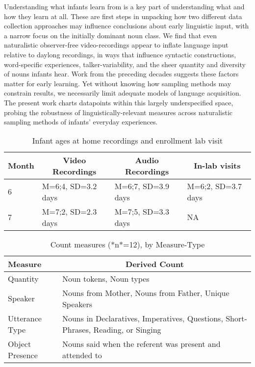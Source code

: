 \documentclass[man]{apa6}
\theoremstyle{definition}
\theoremstyle{definition}
\theoremstyle{definition}
\theoremstyle{remark}
\begin{document}
Understanding what infants learn from is a key part of understanding
what and how they learn at all. These are first steps in unpacking how
two different data collection approaches may influence conclusions about
early linguistic input, with a narrow focus on the initially dominant
noun class. We find that even naturalistic observer-free
video-recordings appear to inflate language input relative to daylong
recordings, in ways that influence syntactic constructions,
word-specific experiences, talker-variability, and the sheer quantity
and diversity of nouns infants hear. Work from the preceding decades
suggests these factors matter for early learning. Yet without knowing
how sampling methods may constrain results, we necessarily limit
adequate models of language acquisition. The present work charts
datapoints within this largely underspecified space, probing the
robustness of linguistically-relevant measures across naturalistic
sampling methods of infants' everyday experiences.\newpage

\begin{table}[tbp]
\begin{center}
\begin{threeparttable}
\caption{\label{tab:recording-ages-table}Infant ages at home recordings and enrollment lab visit}
\begin{tabular}{llll}
\toprule
Month & \multicolumn{1}{c}{Video Recordings} & \multicolumn{1}{c}{Audio Recordings} & \multicolumn{1}{c}{In-lab visits}\\
\midrule
6 & M=6;4, SD=3.2 days & M=6;7, SD=3.9 days & M=6;2, SD=3.7 days\\
7 & M=7;2, SD=2.3 days & M=7;5, SD=3.3 days & NA\\
\bottomrule
\end{tabular}
\end{threeparttable}
\end{center}
\end{table}

\pagebreak

\begin{table}[tbp]
\begin{center}
\begin{threeparttable}
\caption{\label{tab:measures-tab}Count measures (*n*=12), by Measure-Type}
\small{
\begin{tabular}{ll}
\toprule
Measure & \multicolumn{1}{c}{Derived Count}\\
\midrule
Quantity & Noun tokens, Noun types\\
Speaker & Nouns from Mother, Nouns from Father, Unique Speakers\\
Utterance Type & Nouns in Declaratives, Imperatives, Questions, Short-Phrases, Reading, or Singing\\
Object Presence & Nouns said when the referent was present and attended to\\
\bottomrule
\end{tabular}
}
\end{threeparttable}
\end{center}
\end{table}
\end{document}

